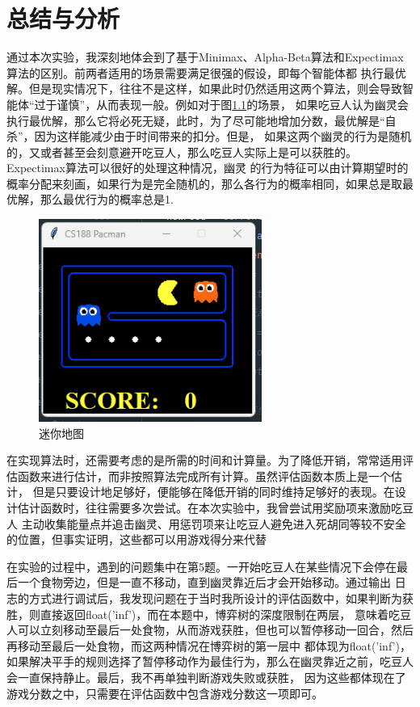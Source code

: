 \chapter{总结与分析}
%
%
通过本次实验，我深刻地体会到了基于Minimax、Alpha-Beta算法和Expectimax算法的区别。前两者适用的场景需要满足很强的假设，即每个智能体都
执行最优解。但是现实情况下，往往不是这样，如果此时仍然适用这两个算法，则会导致智能体“过于谨慎”，从而表现一般。例如对于图\ref{exp}的场景，
如果吃豆人认为幽灵会执行最优解，那么它将必死无疑，此时，为了尽可能地增加分数，最优解是“自杀”，因为这样能减少由于时间带来的扣分。但是，
如果这两个幽灵的行为是随机的，又或者甚至会刻意避开吃豆人，那么吃豆人实际上是可以获胜的。Expectimax算法可以很好的处理这种情况，幽灵
的行为特征可以由计算期望时的概率分配来刻画，如果行为是完全随机的，那么各行为的概率相同，如果总是取最优解，那么最优行为的概率总是1.

\begin{figure}[H]
    \centering
    \includegraphics{./pic/sum.png}
    \caption{迷你地图}\label{exp}
\end{figure}

在实现算法时，还需要考虑的是所需的时间和计算量。为了降低开销，常常适用评估函数来进行估计，而非按照算法完成所有计算。虽然评估函数本质上是一个估计，
但是只要设计地足够好，便能够在降低开销的同时维持足够好的表现。在设计估计函数时，往往需要多次尝试。在本次实验中，我曾尝试用奖励项来激励吃豆人
主动收集能量点并追击幽灵、用惩罚项来让吃豆人避免进入死胡同等较不安全的位置，但事实证明，这些都可以用游戏得分来代替

在实验的过程中，遇到的问题集中在第5题。一开始吃豆人在某些情况下会停在最后一个食物旁边，但是一直不移动，直到幽灵靠近后才会开始移动。通过输出
日志的方式进行调试后，我发现问题在于当时我所设计的评估函数中，如果判断为获胜，则直接返回float('inf')，而在本题中，博弈树的深度限制在两层，
意味着吃豆人可以立刻移动至最后一处食物，从而游戏获胜，但也可以暂停移动一回合，然后再移动至最后一处食物，而这两种情况在博弈树的第一层中
都体现为float('inf')，如果解决平手的规则选择了暂停移动作为最佳行为，那么在幽灵靠近之前，吃豆人会一直保持静止。最后，我不再单独判断游戏失败或获胜，
因为这些都体现在了游戏分数之中，只需要在评估函数中包含游戏分数这一项即可。